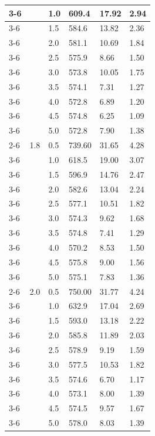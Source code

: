 \begin{longtable}{|p{}|p{}|p{}|p{}|p{}|p{}|}
	\cline{3-6}
	& & 1.0 & 609.4 & 17.92 & 2.94 \\
	\cline{3-6}
	& & 1.5 & 584.6 & 13.82 & 2.36 \\
	\cline{3-6}
	& & 2.0 & 581.1 & 10.69 & 1.84 \\
	\cline{3-6}
	& & 2.5 & 575.9 & 8.66 & 1.50 \\
	\cline{3-6}
	& & 3.0 & 573.8 & 10.05 & 1.75 \\
	\cline{3-6}
	& & 3.5 & 574.1 & 7.31 & 1.27 \\
	\cline{3-6}
	& & 4.0 & 572.8 & 6.89 & 1.20 \\
	\cline{3-6}
	& & 4.5 & 574.8 & 6.25 & 1.09 \\
	\cline{3-6}
	& & 5.0 & 572.8 & 7.90 & 1.38 \\
	\cline{2-6}
	& 1.8 & 0.5 & 739.60 & 31.65 & 4.28 \\
	\cline{3-6}
	& & 1.0 & 618.5 & 19.00 & 3.07 \\
	\cline{3-6}
	& & 1.5 & 596.9 & 14.76 & 2.47 \\
	\cline{3-6}
	& & 2.0 & 582.6 & 13.04 & 2.24 \\
	\cline{3-6}
	& & 2.5 & 577.1 & 10.51 & 1.82 \\
	\cline{3-6}
	& & 3.0 & 574.3 & 9.62 & 1.68 \\
	\cline{3-6}
	& & 3.5 & 574.8 & 7.41 & 1.29 \\
	\cline{3-6}
	& & 4.0 & 570.2 & 8.53 & 1.50 \\
	\cline{3-6}
	& & 4.5 & 575.8 & 9.00 & 1.56 \\
	\cline{3-6}
	& & 5.0 & 575.1 & 7.83 & 1.36 \\
	\cline{2-6}
	& 2.0 & 0.5 & 750.00 & 31.77 & 4.24 \\
	\cline{3-6}
	& & 1.0 & 632.9 & 17.04 & 2.69 \\
	\cline{3-6}
	& & 1.5 & 593.0 & 13.18 & 2.22 \\
	\cline{3-6}
	& & 2.0 & 585.8 & 11.89 & 2.03 \\
	\cline{3-6}
	& & 2.5 & 578.9 & 9.19 & 1.59 \\
	\cline{3-6}
	& & 3.0 & 577.5 & 10.53 & 1.82 \\
	\cline{3-6}
	& & 3.5 & 574.6 & 6.70 & 1.17 \\
	\cline{3-6}
	& & 4.0 & 573.1 & 8.00 & 1.39 \\
	\cline{3-6}
	& & 4.5 & 574.5 & 9.57 & 1.67 \\
	\cline{3-6}
	& & 5.0 & 578.0 & 8.03 & 1.39 \\
	\hline
\end{longtable}